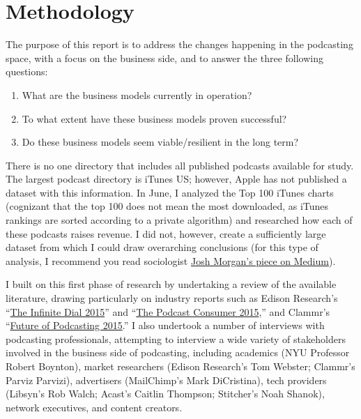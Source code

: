 \documentclass[notoc, symmetric, nobib, nols]{towcenter-guideto-book}
\begin{document}
\chapter{Methodology}

The purpose of this report is to address the changes happening in the podcasting space, with a focus on the business side, and to answer the three following questions: 

\begin{enumerate}
\item What are the business models currently in operation?
\item To what extent have these business models proven successful?
\item Do these business models seem viable/resilient in the long term? 
\end{enumerate}

\noindent There is no one directory that includes all published podcasts available for study. The largest podcast directory is iTunes US; however, Apple has not published a dataset with this information. In June, I analyzed the Top 100 iTunes charts (cognizant that the top 100 does not mean the most downloaded, as iTunes rankings are sorted according to a private algorithm) and researched how each of these podcasts raises revenue. I did not, however, create a sufficiently large dataset from which I could draw overarching conclusions (for this type of analysis, I recommend you read sociologist \href{https://medium.com/@slowerdawn/how-podcasts-have-changed-in-ten-years-by-the-numbers-720a6e984e4e}{Josh Morgan's piece on Medium}\autocite{morgan}).

I built on this first phase of research by undertaking a review of the available literature, drawing particularly on industry reports such as Edison Research's ``\href{http://www.edisonresearch.com/the-infinite-dial-2015/}{The Infinite Dial 2015}'' and ``\href{http://www.edisonresearch.com/the-podcast-consumer-2015/}{The Podcast Consumer 2015},'' and Clammr's ``\href{http://www.slideshare.net/clammrapp/20150617-future-of-podcasting-2015-clammr-v-f}{Future of Podcasting 2015}.'' I also undertook a number of interviews with podcasting professionals, attempting to interview a wide variety of stakeholders involved in the business side of podcasting, including academics (NYU Professor Robert Boynton), market researchers (Edison Research's Tom Webster; Clammr's Parviz Parvizi), advertisers (MailChimp's Mark DiCristina), tech providers (Libsyn's Rob Walch; Acast's Caitlin Thompson; Stitcher's Noah Shanok), network executives, and content creators. 
\end{document}
